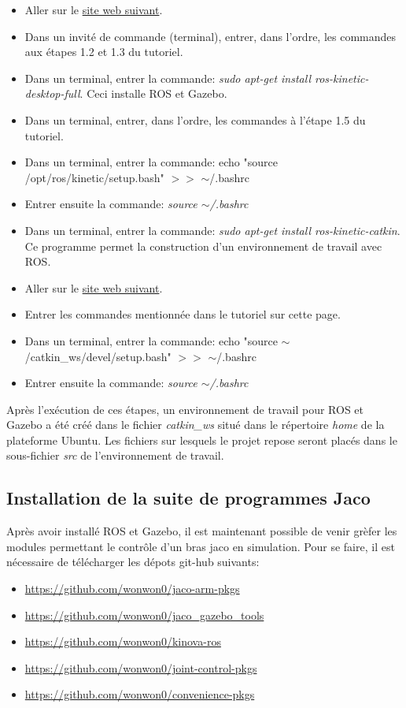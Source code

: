\documentclass[root.tex]{subfiles}
\begin{document}
\begin{itemize}
\item Aller sur le \href{http://wiki.ros.org/kinetic/Installation/Ubuntu}{site web suivant}.
\item Dans un invité de commande (terminal), entrer, dans l'ordre, les commandes aux étapes 1.2 et 1.3 du tutoriel.
\item Dans un terminal, entrer la commande: \textit{sudo apt-get install ros-kinetic-desktop-full}. Ceci installe ROS et Gazebo.
\item Dans un terminal, entrer, dans l'ordre, les commandes à l'étape 1.5 du tutoriel.
\item Dans un terminal, entrer la commande: echo "source /opt/ros/kinetic/setup.bash" $>>$ $\sim$/.bashrc
\item Entrer ensuite la commande: \textit{source $\sim$/.bashrc}
\item Dans un terminal, entrer la commande: \textit{sudo apt-get install ros-kinetic-catkin}. Ce programme permet la construction d'un environnement de travail avec ROS.
\item Aller sur le \href{http://wiki.ros.org/catkin/Tutorials/create_a_workspace}{site web suivant}.
\item Entrer les commandes mentionnée dans le tutoriel sur cette page.
\item Dans un terminal, entrer la commande: echo "source $\sim$/catkin\_ws/devel/setup.bash" $>>$ $\sim$/.bashrc
\item Entrer ensuite la commande: \textit{source $\sim$/.bashrc}
\end{itemize}

Après l'exécution de ces étapes, un environnement de travail pour ROS et Gazebo a été créé dans le fichier \textit{catkin\_ws} situé dans le répertoire \textit{home} de la plateforme Ubuntu.
Les fichiers sur lesquels le projet repose seront placés dans le sous-fichier \textit{src} de l'environnement de travail.

\subsection{Installation de la suite de programmes Jaco}

Après avoir installé ROS et Gazebo, il est maintenant possible de venir grèfer les modules permettant le contrôle d'un bras jaco en simulation.
Pour se faire, il est nécessaire de télécharger les dépots git-hub suivants:
\begin{itemize}
\item \url{https://github.com/wonwon0/jaco-arm-pkgs}
\item \url{https://github.com/wonwon0/jaco_gazebo_tools}
\item \url{https://github.com/wonwon0/kinova-ros}
\item \url{https://github.com/wonwon0/joint-control-pkgs}
\item \url{https://github.com/wonwon0/convenience-pkgs}

\end{itemize}
\end{document}
